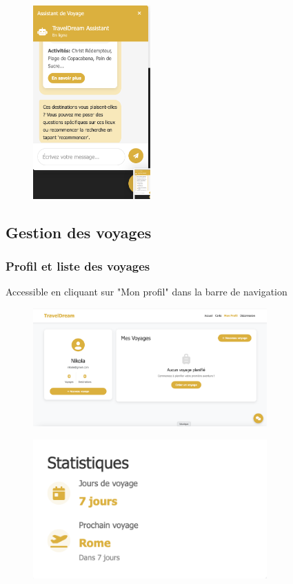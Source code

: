 \documentclass[a4paper,12pt]{article}
\begin{document}
\begin{figure}[H]
    \centering
    \includegraphics[width=0.4\textwidth]{6_chatbot_7.png}
\end{figure}

\subsection{Gestion des voyages}

\subsubsection{Profil et liste des voyages}
Accessible en cliquant sur "Mon profil" dans la barre de navigation
\begin{figure}[H]
    \centering
    \includegraphics[width=0.8\textwidth]{7_profil_voyage.png}
\end{figure}
\begin{figure}[H]
    \centering
    \includegraphics[width=0.8\textwidth]{7_profil_voyage_stats.png}
\end{figure}
\end{document}
